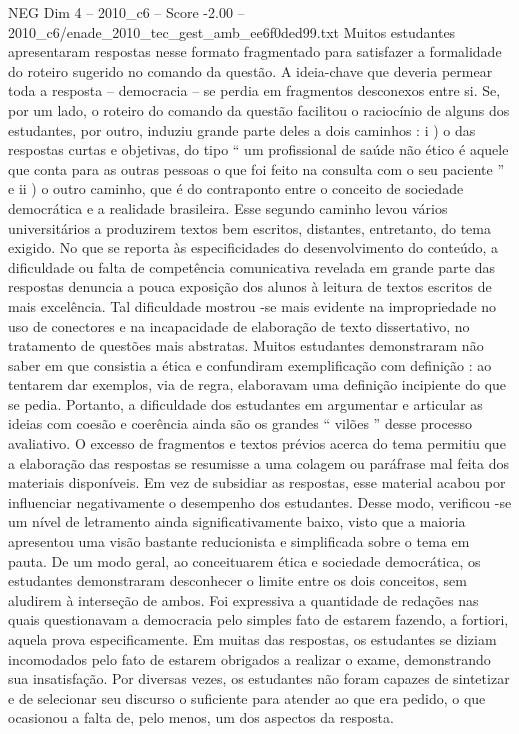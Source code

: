 \begin{textsample}{NEG Dim 4 – 2010\_c6 – Score -2.00 – 2010\_c6/enade\_2010\_tec\_gest\_amb\_ee6f0ded99.txt}
Muitos estudantes apresentaram respostas nesse formato fragmentado para satisfazer a formalidade do roteiro sugerido no comando da questão.
A ideia-chave que deveria permear toda a resposta – democracia – se perdia em fragmentos desconexos entre si.
Se, por um lado, o roteiro do comando da questão facilitou o raciocínio de alguns dos estudantes, por outro, induziu grande parte deles a dois caminhos : i ) o das respostas curtas e objetivas, do tipo “ um profissional de saúde não ético é aquele que conta para as outras pessoas o que foi feito na consulta com o seu paciente ” e ii ) o outro caminho, que é do contraponto entre o conceito de sociedade democrática e a realidade brasileira.
Esse segundo caminho levou vários universitários a produzirem textos bem escritos, distantes, entretanto, do tema exigido.
No que se reporta às especificidades do desenvolvimento do conteúdo, a dificuldade ou falta de competência comunicativa revelada em grande parte das respostas denuncia a pouca exposição dos alunos à leitura de textos escritos de mais excelência.
Tal dificuldade mostrou -se mais evidente na impropriedade no uso de conectores e na incapacidade de elaboração de texto dissertativo, no tratamento de questões mais abstratas.
Muitos estudantes demonstraram não saber em que consistia a ética e confundiram exemplificação com definição : ao tentarem dar exemplos, via de regra, elaboravam uma definição incipiente do que se pedia.
Portanto, a dificuldade dos estudantes em argumentar e articular as ideias com coesão e coerência ainda são os grandes “ vilões ” desse processo avaliativo.
O excesso de fragmentos e textos prévios acerca do tema permitiu que a elaboração das respostas se resumisse a uma colagem ou paráfrase mal feita dos materiais disponíveis.
Em vez de subsidiar as respostas, esse material acabou por influenciar negativamente o desempenho dos estudantes.
Desse modo, verificou -se um nível de letramento ainda significativamente baixo, visto que a maioria apresentou uma visão bastante reducionista e simplificada sobre o tema em pauta.
De um modo geral, ao conceituarem ética e sociedade democrática, os estudantes demonstraram desconhecer o limite entre os dois conceitos, sem aludirem à interseção de ambos.
Foi expressiva a quantidade de redações nas quais questionavam a democracia pelo simples fato de estarem fazendo, a fortiori, aquela prova especificamente.
Em muitas das respostas, os estudantes se diziam incomodados pelo fato de estarem obrigados a realizar o exame, demonstrando sua insatisfação.
Por diversas vezes, os estudantes não foram capazes de sintetizar e de selecionar seu discurso o suficiente para atender ao que era pedido, o que ocasionou a falta de, pelo menos, um dos aspectos da resposta.

\end{textsample}
